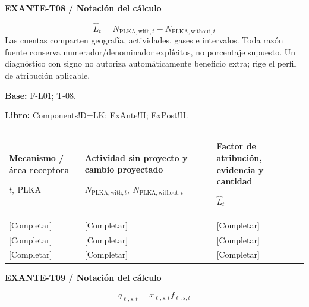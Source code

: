 \textbf{EXANTE-T08 / Notación del cálculo}\par
{\fontsize{9}{11}\selectfont\[ \widehat L_t=N_{\mathrm{PLKA,with},t}-N_{\mathrm{PLKA,without},t} \]}
Las cuentas comparten geografía, actividades, gases e intervalos. Toda razón fuente conserva numerador/denominador explícitos, no porcentaje supuesto. Un diagnóstico con signo no autoriza automáticamente beneficio extra; rige el perfil de atribución aplicable.\par
\textbf{Base:} F-L01; T-08.\par
\textbf{Libro:} Components!D=LK; ExAnte!H; ExPost!H.\par\endgroup
{\sffamily\fontsize{8.3}{10.3}\selectfont\begin{longtable}{@{}P{54.83mm} P{54.83mm} P{54.83mm}@{}}
\toprule
\textbf{Mecanismo / área receptora}\par {\normalfont\fontsize{8.2}{10}\selectfont $t,\ \mathrm{PLKA}$} & \textbf{Actividad sin proyecto y cambio proyectado}\par {\normalfont\fontsize{8.2}{10}\selectfont $N_{\mathrm{PLKA,with},t},\ N_{\mathrm{PLKA,without},t}$} & \textbf{Factor de atribución, evidencia y cantidad}\par {\normalfont\fontsize{8.2}{10}\selectfont $\widehat L_t$}\\\midrule\endhead
\rule{0pt}{8mm}[Completar] & [Completar] & [Completar]\\\hline
\rule{0pt}{8mm}[Completar] & [Completar] & [Completar]\\\hline
\rule{0pt}{8mm}[Completar] & [Completar] & [Completar]\\\hline
\end{longtable}}
\par\begingroup\sffamily\fontsize{8}{10}\selectfont\color{NEBGreen}\setlength{\parskip}{2pt}\setlength{\abovedisplayskip}{4pt}\setlength{\belowdisplayskip}{4pt}\setlength{\abovedisplayshortskip}{2pt}\setlength{\belowdisplayshortskip}{3pt}
\textbf{EXANTE-T09 / Notación del cálculo}\par
{\fontsize{9}{11}\selectfont\[ q_{\ell,s,t}=x_{\ell,s,t}f_{\ell,s,t} \]}
